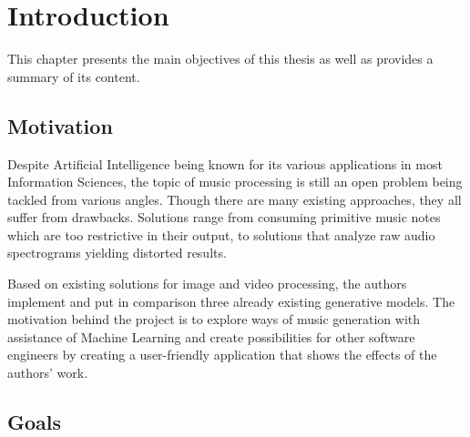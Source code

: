 \documentclass[a4paper, 11pt, twoside]{report}
\theoremstyle{definition}
\begin{document}

\null\thispagestyle{empty}\newpage
{} %

\tableofcontents
\thispagestyle{empty}
\newpage %

\null\thispagestyle{empty}\newpage
\pagestyle{fancy}
\setcounter{page}{11}


\chapter*{Introduction}

This chapter presents the main objectives of this thesis as well as provides a summary of its content. \par


\section*{Motivation}

Despite Artificial Intelligence being known for its various applications in most Information Sciences, the topic of music processing is still an open problem being tackled from various angles. Though there are many existing approaches, they all suffer from drawbacks. Solutions range from consuming primitive music notes \cite{musenet} which are too restrictive in their output, to solutions that analyze raw audio spectrograms \cite{Forsgren_Martiros_2022} yielding distorted results. \par
Based on existing solutions for image and video processing, the authors implement and put in comparison three already existing generative models. The motivation behind the project is to explore ways of music generation with assistance of Machine Learning and create possibilities for other software engineers by creating a user-friendly application that shows the effects of the authors' work. \par


\section*{Goals}
\end{document}
